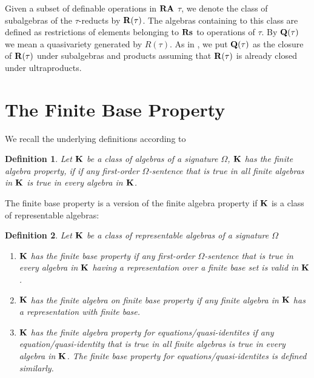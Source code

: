 \documentclass[a4paper]{article}
\theoremstyle{defin}
\newtheorem{defin}{Definition}
\theoremstyle{theorem}
\theoremstyle{prop}
\theoremstyle{lemma}
\theoremstyle{ex}
\theoremstyle{col}
\begin{document}
Given a subset of definable operations in ${\bf RA}$ $\tau$, we denote the class of subalgebras of the
$\tau$-reducts by ${\bf R}(\tau)$. The algebras containing to this class are defined as restrictions of
elements belonging to ${\bf Rs}$ to operations of $\tau$. By ${\bf Q}(\tau)$ we mean a quasivariety generated by $R(\tau)$. As in \cite{hirsch2011positive}, we put ${\bf Q}(\tau)$ as the closure of ${\bf R}(\tau)$ under subalgebras and products assuming that ${\bf R}(\tau)$ is already closed under ultraproducts.

\section{The Finite Base Property}

We recall the underlying definitions according to \cite[Section 19]{hirsch2002relation}

\begin{defin}
  Let ${\bf K}$ be a class of algebras of a signature $\Omega$, ${\bf K}$ has the finite algebra property, if
  if any first-order $\Omega$-sentence that is true in all finite algebras in ${\bf K}$ is true in every algebra in ${\bf K}$.
\end{defin}

The finite base property is a version of the finite algebra property if ${\bf K}$ is a class of representable algebras:

\begin{defin}
Let ${\bf K}$ be a class of representable algebras of a signature $\Omega$

  \begin{enumerate}
  \item ${\bf K}$ has the finite base property if any first-order $\Omega$-sentence that is true in every algebra in ${\bf K}$ having a representation over a finite base set is valid in ${\bf K}$.
  \item ${\bf K}$ has the finite algebra on finite base property if any finite algebra in ${\bf K}$ has a representation with finite base.
  \item ${\bf K}$ has the finite algebra property for equations/quasi-identites if any equation/quasi-identity that is true in all finite algebras is true in every algebra in ${\bf K}$. The finite base property for equations/quasi-identites is defined similarly.
\end{enumerate}
\end{defin}
\end{document}
